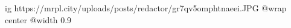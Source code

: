  
 
 
 
 

\ifcmt
  ig https://mrpl.city/uploads/posts/redactor/gr7qv5omphtnaeei.JPG
  @wrap center
  @width 0.9
\fi
